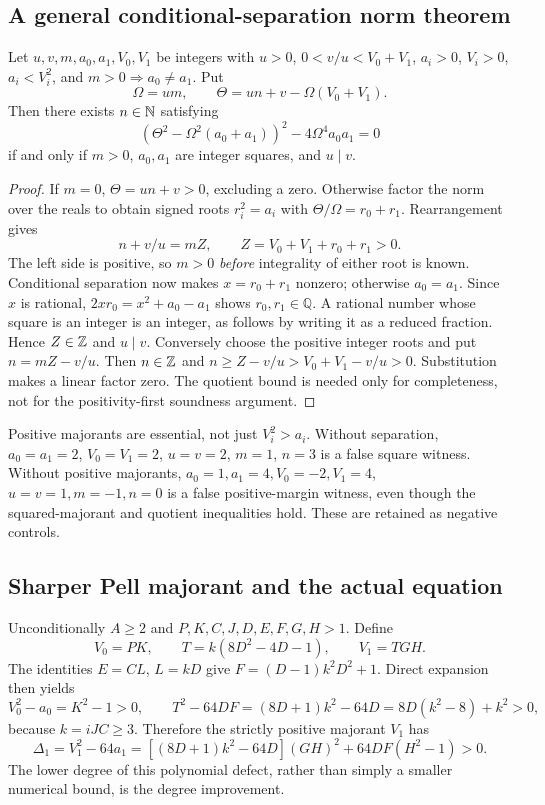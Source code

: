 \subsection{A general conditional-separation norm theorem}
\begin{theorem}\label{thm:conditional}
Let $u,v,m,a_0,a_1,V_0,V_1$ be integers with $u>0$,
$0<v/u<V_0+V_1$, $a_i>0$, $V_i>0$, $a_i<V_i^2$, and
$m>0\Rightarrow a_0\ne a_1$. Put
\[
 \Omega=um,\qquad \Theta=un+v-\Omega(V_0+V_1).
\]
Then there exists $n\in\mathbb N$ satisfying
\[
 (\Theta^2-\Omega^2(a_0+a_1))^2-4\Omega^4a_0a_1=0
\]
if and only if $m>0$, $a_0,a_1$ are integer squares, and $u\mid v$.
\end{theorem}
\begin{proof}
If $m=0$, $\Theta=un+v>0$, excluding a zero. Otherwise factor the norm
over the reals to obtain signed roots $r_i^2=a_i$ with
$\Theta/\Omega=r_0+r_1$. Rearrangement gives
\[
 n+v/u=mZ,\qquad Z=V_0+V_1+r_0+r_1>0.
\]
The left side is positive, so $m>0$ \emph{before} integrality of either
root is known. Conditional separation now makes $x=r_0+r_1$ nonzero;
otherwise $a_0=a_1$. Since $x$ is rational,
$2xr_0=x^2+a_0-a_1$ shows $r_0,r_1\in\mathbb Q$.
A rational number whose square is an integer is an integer, as follows
by writing it as a reduced fraction. Hence $Z\in\mathbb Z$ and $u\mid v$.
Conversely choose the positive integer roots and put $n=mZ-v/u$.
Then $n\in\mathbb Z$ and $n\ge Z-v/u>V_0+V_1-v/u>0$.
Substitution makes a linear factor zero. The quotient bound is needed only
for completeness, not for the positivity-first soundness argument.
\end{proof}
Positive majorants are essential, not just $V_i^2>a_i$. Without separation,
$a_0=a_1=2$, $V_0=V_1=2$, $u=v=2$, $m=1$, $n=3$ is a false square
witness. Without positive majorants, $a_0=1,a_1=4,V_0=-2,V_1=4$,
$u=v=1,m=-1,n=0$ is a false positive-margin witness, even though the
squared-majorant and quotient inequalities hold. These are retained
as negative controls.

\subsection{Sharper Pell majorant and the actual equation}
Unconditionally $A\ge2$ and $P,K,C,J,D,E,F,G,H>1$. Define
\[
 V_0=PK,\qquad T=k(8D^2-4D-1),\qquad V_1=TGH.
\]
The identities $E=CL$, $L=kD$ give $F=(D-1)k^2D^2+1$. Direct expansion
then yields
\[
 V_0^2-a_0=K^2-1>0,\qquad
 T^2-64DF=(8D+1)k^2-64D=8D(k^2-8)+k^2>0,
\]
because $k=iJC\ge3$. Therefore the strictly positive majorant $V_1$ has
\[
 \Delta_1=V_1^2-64a_1
 =[(8D+1)k^2-64D](GH)^2+64DF(H^2-1)>0.
\]
The lower degree of this polynomial defect, rather than simply a smaller
numerical bound, is the degree improvement.

